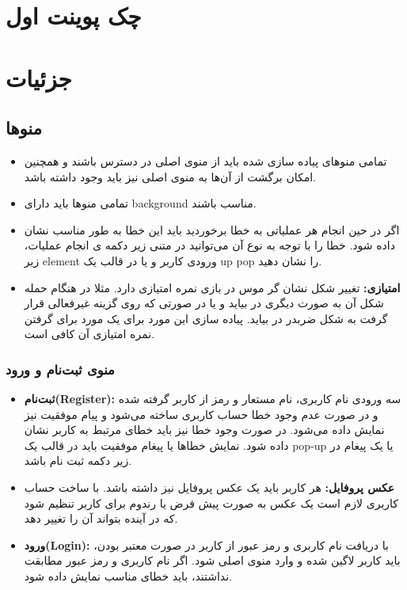 \documentclass[]{article}
\begin{document}
\newpage


\section*{{\titr چک پوینت اول}}
\section*{{\titr جزئیات}}

\subsection*{{\titr منوها}}

\begin{itemize}
\item تمامی منوهای پیاده سازی شده باید از منوی اصلی در دسترس باشند و همچنین امکان برگشت از آن‌ها به منوی اصلی نیز باید وجود داشته باشد.

\item تمامی منوها باید دارای background مناسب باشند.
\item  اگر در حین انجام هر عملیاتی به خطا برخوردید باید این خطا به طور مناسب نشان داده شود. خطا را با توجه به نوع آن می‌توانید در متنی زیر دکمه ی انجام عملیات، زیر element ورودی کاربر و یا در قالب یک up pop را نشان دهید.
\item \textbf{امتیازی:} تغییر شکل نشان گر موس در بازی نمره امتیازی دارد. مثلا در هنگام حمله شکل آن به صورت دیگری در بیاید و یا در صورتی که روی گزینه غیرفعالی قرار گرفت به شکل ضربدر در بیاید. پیاده سازی این مورد برای یک مورد برای گرفتن نمره امتیازی آن کافی است. 
\end{itemize}



\subsubsection*{{\titr منوی ثبت‌نام و ورود}}
\begin{itemize}
    \item \textbf{ثبت‌نام(Register):} سه ورودی نام کاربری، نام مستعار و رمز از کاربر گرفته شده و در صورت عدم وجود خطا حساب کاربری ساخته می‌شود و پیام موفقیت نیز نمایش داده می‌شود. در صورت وجود خطا نیز باید خطای مرتبط به کاربر نشان داده‌ شود. نمایش خطاها یا پیغام موفقیت باید در قالب یک pop-up یا یک پیغام در زیر دکمه ثبت نام باشد.
 \item \textbf{عکس پروفایل:} هر کاربر باید یک عکس پروفایل نیز داشته باشد. با ساخت حساب کاربری لازم است یک عکس به صورت پیش فرض یا رندوم برای کاربر تنظیم شود که در آینده بتواند آن را تغییر دهد.
\item \textbf{ورود(Login):} با دریافت نام کاربری و رمز عبور از کاربر در صورت معتبر بودن، باید کاربر لاگین شده و وارد منوی اصلی شود. اگر نام کاربری و رمز عبور مطابقت نداشتند، باید خطای مناسب نمایش داده شود.
\end{itemize}
\end{document}
